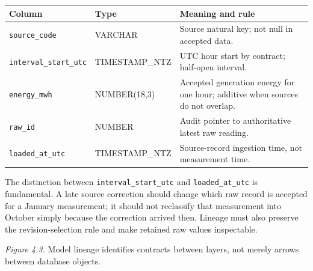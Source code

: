 \documentclass[11pt,twoside]{article}
\begin{document}
\begin{center}
\small\begin{tabularx}{\linewidth}{@{}p{30mm}p{23mm}X@{}}\toprule
Column & Type & Meaning and rule\\\midrule
\texttt{source\_code} & VARCHAR & Source natural key; not null in accepted data.\\
{\fontsize{8.2}{9.7}\selectfont\texttt{interval\_start\_utc}} & {\fontsize{8.2}{9.7}\selectfont TIMESTAMP\_NTZ} & UTC hour start by contract; half-open interval.\\
\texttt{energy\_mwh} & NUMBER(18,3) & Accepted generation energy for one hour; additive when sources do not overlap.\\
\texttt{raw\_id} & NUMBER & Audit pointer to authoritative latest raw reading.\\
{\fontsize{8.2}{9.7}\selectfont\texttt{loaded\_at\_utc}} & {\fontsize{8.2}{9.7}\selectfont TIMESTAMP\_NTZ} & Source-record ingestion time, not measurement time.\\\bottomrule
\end{tabularx}
\end{center}

The distinction between \texttt{interval\_start\_utc} and \texttt{loaded\_at\_utc} is fundamental. A late source correction should change which raw record is accepted for a January measurement; it should not reclassify that measurement into October simply because the correction arrived then. Lineage must also preserve the revision-selection rule and make retained raw values inspectable.

\begin{center}
\end{center}
\textit{Figure 4.3.} Model lineage identifies contracts between layers, not merely arrows between database objects.
\end{document}
